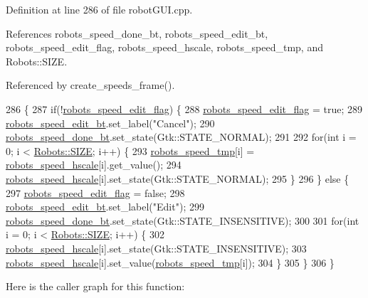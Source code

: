 Definition at line 286 of file robot\+G\+U\+I.\+cpp.



References robots\+\_\+speed\+\_\+done\+\_\+bt, robots\+\_\+speed\+\_\+edit\+\_\+bt, robots\+\_\+speed\+\_\+edit\+\_\+flag, robots\+\_\+speed\+\_\+hscale, robots\+\_\+speed\+\_\+tmp, and Robots\+::\+S\+I\+ZE.



Referenced by create\+\_\+speeds\+\_\+frame().


\begin{DoxyCode}
286                                                          \{
287     \textcolor{keywordflow}{if}(!\hyperlink{class_robot_g_u_i_a0da216285bd7ded79b85328191d0354d}{robots\_speed\_edit\_flag}) \{
288         \hyperlink{class_robot_g_u_i_a0da216285bd7ded79b85328191d0354d}{robots\_speed\_edit\_flag} = \textcolor{keyword}{true};
289         \hyperlink{class_robot_g_u_i_aeb9008eb20d42d90fe39564179598d6d}{robots\_speed\_edit\_bt}.set\_label(\textcolor{stringliteral}{"Cancel"});
290         \hyperlink{class_robot_g_u_i_accc677ab2d9cd534389956e6d41ee55c}{robots\_speed\_done\_bt}.set\_state(Gtk::STATE\_NORMAL);
291 
292         \textcolor{keywordflow}{for}(\textcolor{keywordtype}{int} i = 0; i < \hyperlink{class_robots_ae9df2f1d345ad6740f0459956cdd4712}{Robots::SIZE}; i++) \{
293             \hyperlink{class_robot_g_u_i_ae952e428401558e2c81d1c3ed8ecb7e2}{robots\_speed\_tmp}[i] = \hyperlink{class_robot_g_u_i_a25c9dbce938a0b6fa4de5c7174d062af}{robots\_speed\_hscale}[i].get\_value();
294             \hyperlink{class_robot_g_u_i_a25c9dbce938a0b6fa4de5c7174d062af}{robots\_speed\_hscale}[i].set\_state(Gtk::STATE\_NORMAL);
295         \}
296     \} \textcolor{keywordflow}{else} \{
297         \hyperlink{class_robot_g_u_i_a0da216285bd7ded79b85328191d0354d}{robots\_speed\_edit\_flag} = \textcolor{keyword}{false};
298         \hyperlink{class_robot_g_u_i_aeb9008eb20d42d90fe39564179598d6d}{robots\_speed\_edit\_bt}.set\_label(\textcolor{stringliteral}{"Edit"});
299         \hyperlink{class_robot_g_u_i_accc677ab2d9cd534389956e6d41ee55c}{robots\_speed\_done\_bt}.set\_state(Gtk::STATE\_INSENSITIVE);
300 
301         \textcolor{keywordflow}{for}(\textcolor{keywordtype}{int} i = 0; i < \hyperlink{class_robots_ae9df2f1d345ad6740f0459956cdd4712}{Robots::SIZE}; i++) \{
302             \hyperlink{class_robot_g_u_i_a25c9dbce938a0b6fa4de5c7174d062af}{robots\_speed\_hscale}[i].set\_state(Gtk::STATE\_INSENSITIVE);
303             \hyperlink{class_robot_g_u_i_a25c9dbce938a0b6fa4de5c7174d062af}{robots\_speed\_hscale}[i].set\_value(\hyperlink{class_robot_g_u_i_ae952e428401558e2c81d1c3ed8ecb7e2}{robots\_speed\_tmp}[i]);
304         \}
305     \}
306 \}
\end{DoxyCode}
Here is the caller graph for this function\+:
\mbox{\label{class_robot_g_u_i_adb3915e1e117c2d3c1b66607c793819f}} 
